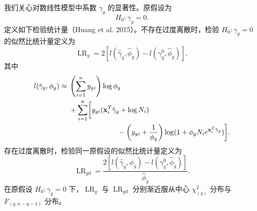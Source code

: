 我们关心对数线性模型中系数 $\gamma_g$ 的显著性。原假设为
\[
H_0:\gamma_g=0.
\]
定义如下检验统计量（Huang et al. 2015）。不存在过度离散时，检验 $H_0:\gamma_g=0$ 的似然比统计量定义为
\begin{equation}
\operatorname{LR}_g=2\left[l(\hat\gamma_g,\hat\phi_g)-l(\gamma_g^0,\hat\phi_g)\right],
\tag{4.104}
\end{equation}
其中
\[
\begin{aligned}
l(\hat\gamma_g,\phi_g)\approx{}&\left(\sum_{i=1}^{n}y_{gi}\right)\log\phi_g\\
&+\sum_{i=1}^{n}\biggl[y_{gi}(\mathbf x_i^T\hat\gamma_g+\log N_i)\\
&\hspace{24mm}-\left(y_{gi}+\frac1{\phi_g}\right)
\log(1+\phi_gN_i e^{\mathbf x_i^T\hat\gamma_g})\biggr].
\end{aligned}
\]
存在过度离散时，检验同一原假设的似然比统计量定义为
\begin{equation}
\operatorname{LR}_{gd}
=\frac{2\left[l(\hat\gamma_g,\hat\phi_g)-l(\gamma_g^0,\hat\phi_g)\right]}{\hat\phi_g}.
\tag{4.105}
\end{equation}
在原假设 $H_0:\gamma_g=0$ 下，$\operatorname{LR}_g$ 与 $\operatorname{LR}_{gd}$ 分别渐近服从中心 $\chi^2_{(q)}$ 分布与 $F_{(q,n-q-1)}$ 分布。

